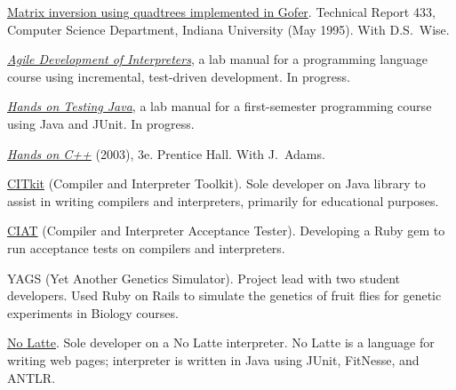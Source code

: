 \documentclass[ComputerScience]{vita}
\begin{document}
\begin{vita}
\begin{Publications}
\begin{Technical Reports}
  \item \href{http://www.cs.indiana.edu/Research/techreports/TR433.shtml}{Matrix inversion using quadtrees implemented in Gofer}.  Technical Report 433, Computer Science Department, Indiana University (May 1995).  With D.S.~Wise.

  \end{Technical Reports}

  \begin{Lab Manuals}
  
  \item \href{http://cs.calvin.edu/curriculum/cs/214/jdfrens/Labs/Interpreters}{\textit{Agile Development of Interpreters}}, a lab manual for a programming language course using incremental, test-driven development.  In progress.
  
  \item \href{http://cs.calvin.edu/curriculum/cs/108/HoTJ/}{\textit{Hands on Testing Java}}, a lab manual for a first-semester programming course using Java and JUnit.  In progress.

  \item \href{http://cs.calvin.edu/books/c++/intro/3e/HandsOnC++/}{\textit{Hands on C++}} (2003), 3e.  Prentice Hall.  With J.\ Adams.

  \end{Lab Manuals}

\end{Publications}


\begin{software}
	\item \href{http://citkit.sourceforge.net/}{CITkit} (Compiler and Interpreter Toolkit).  Sole developer on Java library to assist in writing compilers and interpreters, primarily for educational purposes.
	
	\item \href{http://citkit.sourceforge.net/ciat/}{CIAT} (Compiler and Interpreter Acceptance Tester).  Developing a Ruby gem to run acceptance tests on compilers and interpreters.
	
  \item YAGS (Yet Another Genetics Simulator).  Project lead with two student developers.  Used Ruby on Rails to simulate the genetics of fruit flies for genetic experiments in Biology courses.
  
  \item \href{http://nolatte.sourceforge.net/}{No Latte}.  Sole developer on a No Latte interpreter.  No Latte is a language for writing web pages; interpreter is written in Java using JUnit, FitNesse, and ANTLR.
  

\end{software}
\end{vita}
\end{document}
